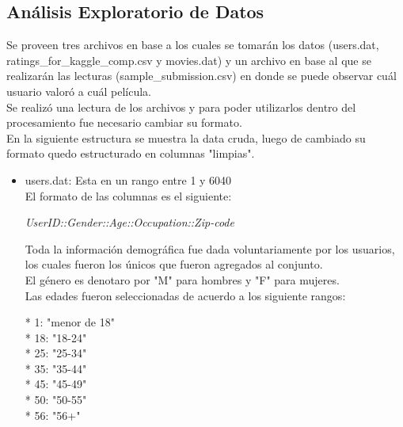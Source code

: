 \documentclass{sciposter}
\begin{document}
\begin{multicols}{3}
\section{An\'alisis Exploratorio de Datos}
Se proveen tres archivos en base a los cuales se tomar\'an los datos (users.dat, ratings\_for\_kaggle\_comp.csv y movies.dat) y un archivo en base al que se realizar\'an las lecturas (sample\_submission.csv) en donde se puede observar cu\'al usuario valor\'o a cu\'al pel\'icula.\\
Se realiz\'o una lectura de los archivos y para poder utilizarlos dentro del procesamiento fue necesario cambiar su formato.\\
En la siguiente estructura se muestra la data cruda, luego de cambiado su formato quedo estructurado en columnas "limpias".
\begin{itemize}
\item users.dat: Esta en un rango entre 1 y 6040\\
El formato de las columnas es el siguiente:\\
\begin{center}
\emph{UserID::Gender::Age::Occupation::Zip-code}
\end{center}
Toda la informaci\'on demogr\'afica fue dada voluntariamente por los usuarios, los cuales fueron los \'unicos que fueron agregados al conjunto.\\
El g\'enero es denotaro por "M" para hombres y "F" para mujeres.\\
Las edades fueron seleccionadas de acuerdo a los siguiente rangos:
\begin{center}
	*  1:  "menor de 18"\\
	* 18:  "18-24"\\
	* 25:  "25-34"\\
	* 35:  "35-44"\\
	* 45:  "45-49"\\
	* 50:  "50-55"\\
	* 56:  "56+"\\
\end{center}


\end{itemize}
\end{multicols}
\end{document}
